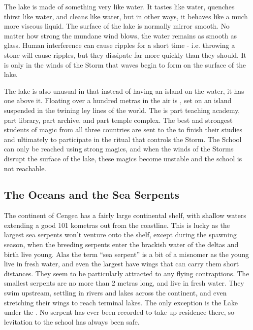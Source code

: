 \documentclass[blue]{GL2020}
\begin{document}
The lake is made of something very like water. It tastes like water, quenches thirst like water, and cleans like water, but in other ways, it behaves like a much more viscous liquid. The surface of the lake is normally mirror smooth. No matter how strong the mundane wind blows, the water remains as smooth as glass. Human interference can cause ripples for a short time - i.e. throwing a stone will cause ripples, but they dissipate far more quickly than they should. It is only in the winds of the Storm that waves begin to form on the surface of the lake.



The lake is also unusual in that instead of having an island on the water, it has one above it. Floating over a hundred metras in the air is \pSchool{}, set on an island suspended in the twining ley lines of the world. The \pSchool{} is part teaching academy, part library, part archive, and part temple complex. The best and strongest students of magic from all three countries are sent to the \pSc{} to finish their studies and ultimately to participate in the ritual that controls the Storm.  The School can only be reached using strong magics, and when the winds of the Storms disrupt the surface of the lake, these magics become unstable and the school is not  reachable.


\subsection*{The Oceans and the Sea Serpents}
The continent of Cengea has a fairly large continental shelf, with shallow waters extending a good 101 kometras out from the coastline. This is lucky as the largest sea serpents won't venture onto the shelf, except during the spawning season, when the breeding serpents enter the brackish water of the deltas and birth live young. Alas the term ``sea serpent'' is a bit of a misnomer as the young live in fresh water, and even the largest have wings that can carry them short distances. They seem to be particularly attracted to any flying contraptions.  The smallest serpents are no more than 2 metras long, and live in fresh water. They swim upstream, settling in rivers and lakes across the continent, and even stretching their wings to reach terminal lakes. The only exception is the Lake under the \pSchool{}. No serpent has ever been recorded to take up residence there, so levitation to the school has always been safe.
\end{document}
